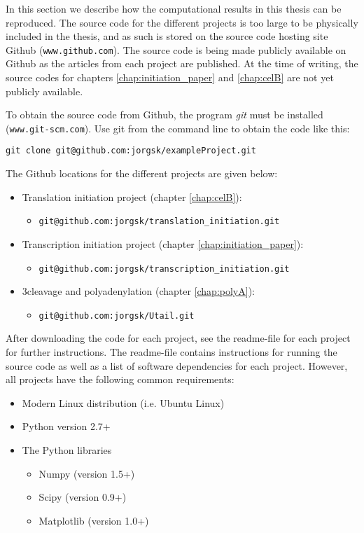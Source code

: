%
%

In this section we describe how the computational results in this thesis
can be reproduced. The source code for the different projects is too
large to be physically included in the thesis, and as such is stored on
the source code hosting site Github (\nolinkurl{www.github.com}). The
source code is being made publicly available on Github as the articles
from each project are published. At the time of writing, the source
codes for chapters \ref{chap:initiation_paper} and \ref{chap:celB} are
not yet publicly available.

To obtain the source code from Github, the program \textit{git} must be
installed (\nolinkurl{www.git-scm.com}). Use git from the command line
to obtain the code like this:

\begin{verbatim}
git clone git@github.com:jorgsk/exampleProject.git
\end{verbatim}

\noindent
The Github locations for the different projects are given below:

\begin{itemize}
	\item Translation initiation project (chapter \ref{chap:celB}):
		\begin{itemize}
			\item[] \nolinkurl{git@github.com:jorgsk/translation_initiation.git}
		\end{itemize}
	\item Transcription initiation project (chapter \ref{chap:initiation_paper}):
		\begin{itemize}
			\item[] \nolinkurl{git@github.com:jorgsk/transcription_initiation.git}
		\end{itemize}
	\item 3\ppp cleavage and polyadenylation (chapter \ref{chap:polyA}):
		\begin{itemize}
			\item[] \nolinkurl{git@github.com:jorgsk/Utail.git}
		\end{itemize}
\end{itemize}

After downloading the code for each project, see the readme-file for each
project for further instructions. The readme-file contains instructions for
running the source code as well as a list of software dependencies for each
project. However, all projects have the following common requirements:
\begin{itemize}
	\item Modern Linux distribution (i.e. Ubuntu Linux)
	\item Python version 2.7+
	\item The Python libraries
		\begin{itemize}
			\item[] Numpy (version 1.5+)
			\item[] Scipy (version 0.9+)
			\item[] Matplotlib (version 1.0+)
		\end{itemize}
\end{itemize}
